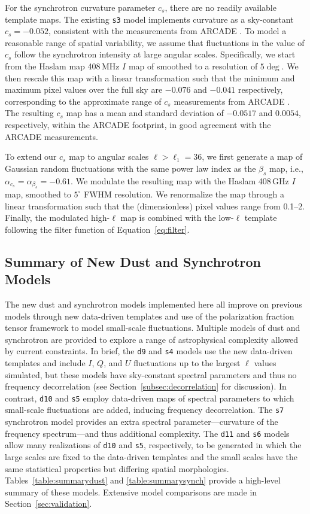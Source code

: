 \documentclass[twocolumn]{aastex631}
\begin{document}
For the synchrotron curvature parameter $c_s$, there are no readily available template maps. The existing \texttt{s3} model implements curvature as a sky-constant $c_s = -0.052$, consistent with the measurements from ARCADE \citep[$c_s=-0.052 \pm 0.005$,][]{Kogut:2012}. To model a reasonable range of spatial variability, we assume that fluctuations in the value of $c_s$ follow the synchrotron intensity at large angular scales. Specifically, we start from the Haslam map 408\,MHz $I$ map of \citet{Remazeilles:2015} smoothed to a resolution of $5 \deg$. We then rescale this map with a linear transformation such that the minimum and maximum pixel values over the full sky are $-0.076$ and $-0.041$ respectively, corresponding to the approximate range of $c_s$ measurements from ARCADE \citep[][Figure~6]{Kogut:2012}. The resulting $c_s$ map has a mean and standard deviation of $-0.0517$ and $0.0054$, respectively, within the ARCADE footprint, in good agreement with the ARCADE measurements.

To extend our $c_s$ map to angular scales $\ell > \ell_1 = 36$, we first generate a map of Gaussian random fluctuations with the same power law index as the $\beta_s$ map, i.e., $\alpha _{c_s}=\alpha _{\beta_s} = -0.61$. We modulate the resulting map with the Haslam 408\,GHz $I$ map, smoothed to $5^\circ$ FWHM resolution. We renormalize the map through a linear transformation such that the (dimensionless) pixel values range from 0.1--2. Finally, the modulated high-$\ell$ map is combined with the low-$\ell$ template following the filter function of Equation~\ref{eq:filter}.

\subsection{Summary of New Dust and Synchrotron Models}

The new dust and synchrotron models implemented here all improve on previous models through new data-driven templates and use of the polarization fraction tensor framework to model small-scale fluctuations. Multiple models of dust and synchrotron are provided to explore a range of astrophysical complexity allowed by current constraints. In brief, the \texttt{d9} and \texttt{s4} models use the new data-driven templates and include $I$, $Q$, and $U$ fluctuations up to the largest $\ell$ values simulated, but these models have sky-constant spectral parameters and thus no frequency decorrelation (see Section~\ref{subsec:decorrelation} for discussion). In contrast, \texttt{d10} and \texttt{s5} employ data-driven maps of spectral parameters to which small-scale fluctuations are added, inducing frequency decorrelation. The \texttt{s7} synchrotron model provides an extra spectral parameter---curvature of the frequency spectrum---and thus additional complexity. The \texttt{d11} and \texttt{s6} models allow many realizations of \texttt{d10} and \texttt{s5}, respectively, to be generated in which the large scales are fixed to the data-driven templates and the small scales have the same statistical properties but differing spatial morphologies. Tables~\ref{table:summarydust} and \ref{table:summarysynch} provide a high-level summary of these models. Extensive model comparisons are made in Section~\ref{sec:validation}.
\end{document}
